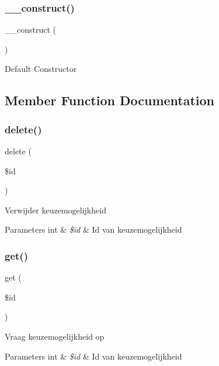 \subsubsection{\texorpdfstring{\+\_\+\+\_\+construct()}{\_\_construct()}}
{\footnotesize\ttfamily \+\_\+\+\_\+construct (\begin{DoxyParamCaption}{ }\end{DoxyParamCaption})}

Default Constructor

\subsection{Member Function Documentation}
\mbox{\label{class_keuzemogelijkheid_a2f8258add505482d7f00ea26493a5723}} 
\subsubsection{\texorpdfstring{delete()}{delete()}}
{\footnotesize\ttfamily delete (\begin{DoxyParamCaption}\item[{}]{\$id }\end{DoxyParamCaption})}

Verwijder keuzemogelijkheid 
\begin{DoxyParams}[1]{Parameters}
int & {\em \$id} & Id van keuzemogelijkheid \\
\hline
\end{DoxyParams}
\mbox{\label{class_keuzemogelijkheid_a50e3bfb586b2f42932a6a93f3fbb0828}} 
\subsubsection{\texorpdfstring{get()}{get()}}
{\footnotesize\ttfamily get (\begin{DoxyParamCaption}\item[{}]{\$id }\end{DoxyParamCaption})}

Vraag keuzemogelijkheid op 
\begin{DoxyParams}[1]{Parameters}
int & {\em \$id} & Id van keuzemogelijkheid \\
\hline
\end{DoxyParams}
\mbox{\label{class_keuzemogelijkheid_a842e4774e3b3601a005b995c02f7e883}} 
